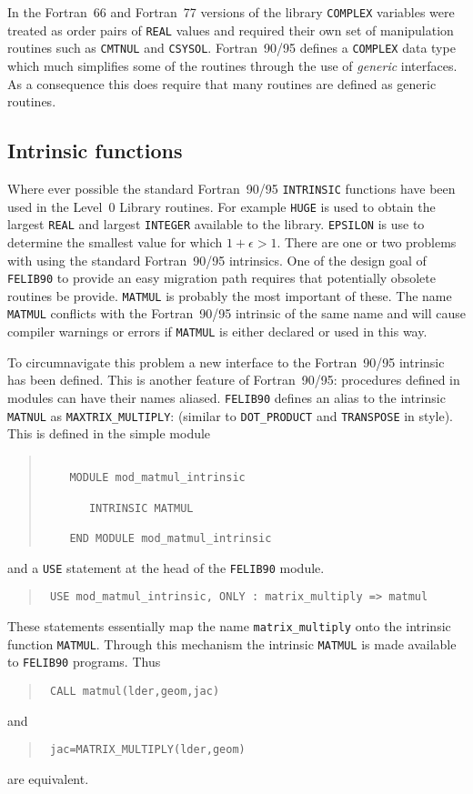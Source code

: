 \documentclass[a4paper,titlepage,11pt]{article}
\begin{document}
In the Fortran~66 and Fortran~77 versions of the library {\tt COMPLEX} variables were
treated as order pairs of {\tt REAL} values and required their own set of manipulation
routines such as {\tt CMTNUL} and {\tt CSYSOL}. Fortran~90/95 defines a {\tt COMPLEX}
data type which much simplifies some of the routines through the use of {\it generic}
interfaces. As a consequence this does require that many routines are defined as generic routines.
%
\subsection{Intrinsic functions}
Where ever possible the standard Fortran~90/95 {\tt INTRINSIC} functions have
been used in the Level~0 Library routines. For example {\tt HUGE} is used to
obtain the largest {\tt REAL} and largest {\tt INTEGER} available to the library.
{\tt EPSILON} is use to determine the smallest value for which $1+\epsilon>1$.
There are one or two problems with using the standard Fortran~90/95 intrinsics. One of the design goal of
{\tt FELIB90} to provide an easy migration path requires that potentially obsolete routines
be provide. {\tt MATMUL} is probably the most important of these. The name {\tt MATMUL}
conflicts with the Fortran~90/95 intrinsic of the same name and will cause compiler 
warnings or errors if {\tt MATMUL} is either declared or used in this way.

To circumnavigate this problem a new interface to the Fortran~90/95 intrinsic
has been defined. This is another feature of Fortran~90/95: procedures defined
in modules can have their names aliased. 
{\tt FELIB90} defines an alias to the intrinsic {\tt MATNUL} as {\tt MAXTRIX\_MULTIPLY}:
 (similar to {\tt DOT\_PRODUCT} and {\tt TRANSPOSE} in style).
This is defined in the simple module
\begin{quote}
\source
\begin{verbatim}

    MODULE mod_matmul_intrinsic
      
       INTRINSIC MATMUL

    END MODULE mod_matmul_intrinsic
\end{verbatim}
\end{quote}
and a {\tt USE} statement at the head of the {\tt FELIB90} module.
\begin{quote}
\tt\source
USE mod\_matmul\_intrinsic, ONLY : matrix\_multiply => matmul
\end{quote}
These statements essentially map the name {\tt matrix\_multiply} onto
the intrinsic function {\tt MATMUL}. Through this mechanism the intrinsic
{\tt MATMUL} is made available to {\tt FELIB90} programs. Thus
\begin{quote}
\source
\tt
CALL matmul(lder,geom,jac)
\end{quote}
and
\begin{quote}
\source
\tt
jac=MATRIX\_MULTIPLY(lder,geom)
\end{quote}
are equivalent.
%
\end{document}
